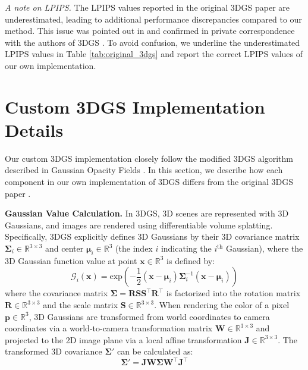 \textit{A note on LPIPS.} The LPIPS values reported in the original 3DGS paper \cite{kerbl3Dgaussians} are underestimated, leading to additional performance discrepancies compared to our method. This issue was pointed out in \cite{bulo2024revising} and confirmed in private correspondence with the authors of 3DGS \cite{kerbl3Dgaussians}. To avoid confusion, we underline the underestimated LPIPS values in Table \ref{tab:original_3dgs} and report the correct LPIPS values of our own implementation.

\section{Custom 3DGS Implementation Details}

Our custom 3DGS implementation closely follow the modified 3DGS algorithm described in Gaussian Opacity Fields \cite{Yu2024GOF}. In this section, we describe how each component in our own implementation of 3DGS differs from the original 3DGS paper \cite{kerbl3Dgaussians}.

\noindent \textbf{Gaussian Value Calculation. } In 3DGS, 3D scenes are represented with 3D Gaussians, and images are rendered using differentiable volume splatting. Specifically, 3DGS explicitly defines 3D Gaussians by their 3D covariance matrix $\mathbf{\Sigma}_i \in \mathbb{R}^{3\times3} $ and center $\bm{\mu}_i \in \mathbb{R}^3$ (the index $i$ indicating the $i^\text{th}$ Gaussian), where the 3D Gaussian function value at point $\mathbf{x}\in \mathbb{R}^{3}$ is defined by:
\begin{equation}
    \mathcal{G}_i(\mathbf{x}) = \text{exp}(-\frac{1}{2}(\mathbf{x} - \bm{\mu}_i)\mathbf{\Sigma}_i^{-1}(\mathbf{x} - \bm{\mu}_i))
\end{equation}
where the covariance matrix $\mathbf{\Sigma} = \mathbf{R}\mathbf{S}\mathbf{S}^\top\mathbf{R}^\top$ is factorized into the rotation matrix $\mathbf{R} \in \mathbb{R}^{3\times3}$ and the scale matrix $\mathbf{S} \in \mathbb{R}^{3\times3}$. When rendering the color of a pixel $\mathbf{p}\in \mathbb{R}^{3}$, 3D Gaussians are transformed from world coordinates to camera coordinates via a world-to-camera transformation matrix $\mathbf{W} \in \mathbb{R}^{3\times3} $ and projected to the 2D image plane via a local affine transformation $\mathbf{J} \in \mathbb{R}^{3\times3} $. The transformed 3D covariance $\mathbf{\Sigma}'$ can be calculated as:
\begin{equation}
    \mathbf{\Sigma}' = \mathbf{J}\mathbf{W}\mathbf{\Sigma}\mathbf{W}^\top\mathbf{J}^\top
\end{equation}

